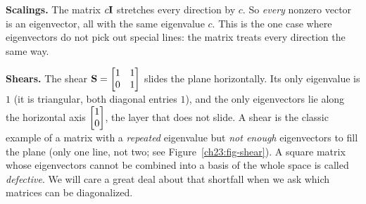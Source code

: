 \textbf{Scalings.} The matrix $c\mathbf{I}$ stretches every direction by $c$. So
\emph{every} nonzero vector is an eigenvector, all with the same eigenvalue $c$.
This is the one case where eigenvectors do not pick out special lines: the
matrix treats every direction the same way.

\textbf{Shears.} The shear $\mathbf{S}=\begin{bmatrix}1&1\\0&1\end{bmatrix}$ slides
the plane horizontally. Its only eigenvalue is $1$ (it is triangular, both diagonal
entries $1$), and the only eigenvectors lie along the horizontal axis
$\begin{bmatrix}1\\0\end{bmatrix}$, the layer that does not slide. A shear is the classic example
of a matrix with a \emph{repeated} eigenvalue but \emph{not enough} eigenvectors
to fill the plane (only one line, not two; see Figure~\ref{ch23:fig-shear}). A
square matrix whose eigenvectors cannot be combined into a basis of the whole space
is called \emph{defective}. We will care a great deal about that
shortfall when we ask which matrices can be diagonalized.


